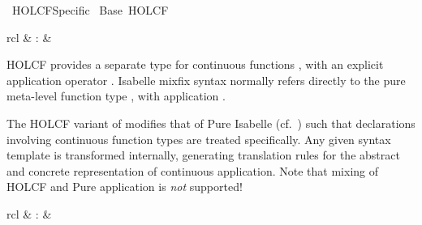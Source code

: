 %
\begin{isabellebody}%
\def\isabellecontext{HOLCF{\isaliteral{5F}{\isacharunderscore}}Specific}%
%
\isadelimtheory
%
\endisadelimtheory
%
\isatagtheory
{}\isamarkupfalse%
\ HOLCF{}Specific\isanewline
{}\ Base\ HOLCF\isanewline
{}%
\endisatagtheory
{\isafoldtheory}%
%
\isadelimtheory
%
\endisadelimtheory
%
\isamarkuptrue%
%
\isamarkuptrue%
%
\begin{isamarkuptext}%
\begin{matharray}{rcl}
    \hypertarget{command.HOLCF.consts}{\hyperlink{command.HOLCF.consts}{\mbox{}}} & : &  \\
  \end{matharray}

  HOLCF provides a separate type for continuous functions , with an explicit application operator .
  Isabelle mixfix syntax normally refers directly to the pure
  meta-level function type , with application .

  The HOLCF variant of \hyperlink{command.HOLCF.consts}{\mbox{}} modifies that of
  Pure Isabelle (cf.\ ) such that declarations
  involving continuous function types are treated specifically.  Any
  given syntax template is transformed internally, generating
  translation rules for the abstract and concrete representation of
  continuous application.  Note that mixing of HOLCF and Pure
  application is \emph{not} supported!%
\end{isamarkuptext}%
\isamarkuptrue%
%
\isamarkuptrue%
%
\begin{isamarkuptext}%
\begin{matharray}{rcl}
    \hypertarget{command.HOLCF.domain}{\hyperlink{command.HOLCF.domain}{\mbox{}}} & : &  \\
  \end{matharray}


\end{isamarkuptext}
\end{isabellebody}
